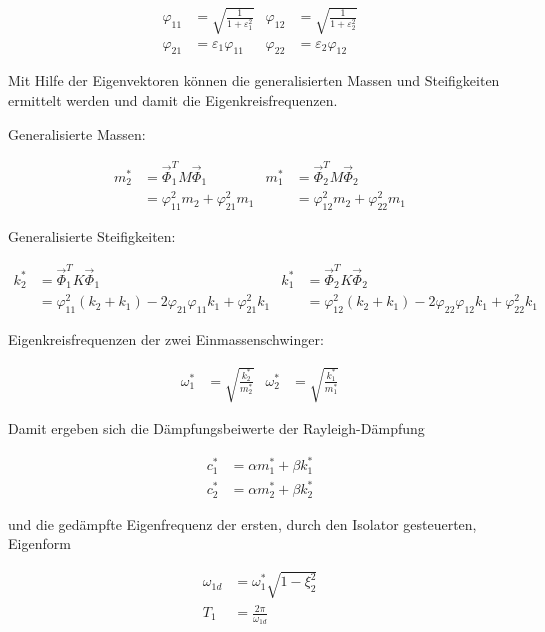 \begin{align*}
\varphi_{11} &= \sqrt{\frac{1}{1 + \varepsilon_1^2}}  &  \varphi_{12} &= \sqrt{\frac{1}{1 + \varepsilon_2^2}}\\
\varphi_{21} &= \varepsilon_1 \varphi_{11}            &  \varphi_{22} &= \varepsilon_2 \varphi_{12}
\end{align*}

Mit Hilfe der Eigenvektoren können die generalisierten Massen und Steifigkeiten ermittelt werden und damit die Eigenkreisfrequenzen.

Generalisierte Massen:

\begin{align*}
m_2^* &= \vec{\Phi}_1^T M \vec{\Phi}_1               &   m_1^* &= \vec{\Phi}_2^T M \vec{\Phi}_2\\
      &= \varphi_{11}^2 m_2 + \varphi_{21}^2 m_1     &         &= \varphi_{12}^2 m_2 + \varphi_{22}^2 m_1
\end{align*}

Generalisierte Steifigkeiten:

\begin{align*}
k_2^* &= \vec{\Phi}_1^T K \vec{\Phi}_1                                                          &   k_1^* &= \vec{\Phi}_2^T K \vec{\Phi}_2\\
      &= \varphi_{11}^2 (k_2 + k_1) - 2 \varphi_{21} \varphi_{11} k_1 + \varphi_{21}^2 k_1      &         &= \varphi_{12}^2 (k_2 + k_1) - 2 \varphi_{22} \varphi_{12} k_1 + \varphi_{22}^2 k_1
\end{align*}

Eigenkreisfrequenzen der zwei Einmassenschwinger:

\begin{align*}
\omega_1^* &= \sqrt{\frac{k_2^*}{m_2^*}}  &  \omega_2^* &= \sqrt{\frac{k_1^*}{m_1^*}}
\end{align*}

Damit ergeben sich die Dämpfungsbeiwerte der Rayleigh-Dämpfung

\begin{align*}
c_1^* &= \alpha m_1^* + \beta k_1^*\\
c_2^* &= \alpha m_2^* + \beta k_2^*
\end{align*}

und die gedämpfte Eigenfrequenz der ersten, durch den Isolator gesteuerten, Eigenform  

\begin{align*}
\omega_{1d} &= \omega_1^* \sqrt{1 - \xi_2^2}\\
T_1         &= \frac{2 \pi}{\omega_{1d}} 
\end{align*}

